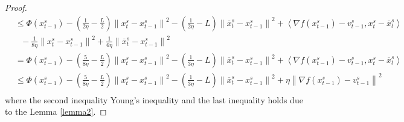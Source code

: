\documentclass{article}
\newcommand{\norm}[1]{\left\lVert#1\right\rVert}
\newcommand{\Iprod}[2]{\left\langle #1,#2\right\rangle}
\theoremstyle{definition}
\theoremstyle{remark}
\begin{document}
\begin{proof}
\begin{equation}
\begin{split}
 & \leq \Phi({x}_{t-1}^s)  -(\frac{1}{2\eta} - \frac{L}{2})\norm{{x}_t^s-x_{t-1}^s}^2- \left(\frac{1}{2\eta}-L\right)\norm{\overline{x}_t^s-x_{t-1}^s}^2+\Iprod{\nabla f(x_{t-1}^s)-v_{t-1}^s}{x_t^s - \overline{x}_t^s}\\
 &\,\,\,\, -\frac{1}{8\eta} \norm{x_t^s-{x}_{t-1}^s}^2 + \frac{1}{6\eta} \norm{\overline{x}_{t}^s-{x}_{t-1}^s}^2\\
 & = \Phi({x}_{t-1}^s)  -(\frac{5}{8\eta} - \frac{L}{2})\norm{{x}_t^s-x_{t-1}^s}^2- \left(\frac{1}{3\eta}-L\right)\norm{\overline{x}_t^s-x_{t-1}^s}^2+\Iprod{\nabla f(x_{t-1}^s)-v_{t-1}^s}{x_t^s - \overline{x}_t^s}\\
  & \leq \Phi({x}_{t-1}^s)  -(\frac{5}{8\eta} - \frac{L}{2})\norm{{x}_t^s-x_{t-1}^s}^2- \left(\frac{1}{3\eta}-L\right)\norm{\overline{x}_t^s-x_{t-1}^s}^2+\eta \norm{\nabla f(x_{t-1}^s)-v_{t-1}^s}^2\\
 \end{split}
 \end{equation}
 where the second inequality Young's inequality and the last inequality holds due to the Lemma \ref{lemma2}.
 

\end{proof}
\end{document}
